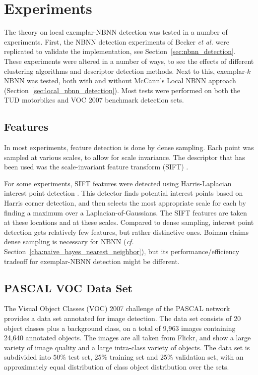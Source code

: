 \chapter{Experiments} %
\label{cha:experimental_setup}

The theory on local exemplar-NBNN detection was tested in a number of experiments. First, the NBNN detection experiments of Becker \emph{et al.} \cite{becker2012codebook} were replicated to validate the implementation, see Section~\ref{sec:nbnn_detection}. These experiments were altered in a number of ways, to see the effects of different clustering algorithms and descriptor detection methods. Next to this, exemplar-$k$NBNN was tested, both with and without McCann's Local NBNN approach (Section~\ref{sec:local_nbnn_detection}). Most tests were performed on both the TUD motorbikes and VOC 2007 benchmark detection sets.

\section{Features} %
\label{sec:features}

In most experiments, feature detection is done by dense sampling. Each point was sampled at various scales, to allow for scale invariance. The descriptor that has been used was the scale-invariant feature transform (SIFT) \cite{lowe2004distinctive}.

For some experiments, SIFT features were detected using Harris-Laplacian interest point detection \cite{mikolajczyk2005comparison, vandeSande2010colorSIFT}. This detector finds potential interest points based on Harris corner detection, and then selects the most appropriate scale for each by finding a maximum over a Laplacian-of-Gaussians. The SIFT features are taken at these locations and at these scales. Compared to dense sampling, interest point detection gets relatively few features, but rather distinctive ones. Boiman claims dense sampling is necessary for NBNN (\emph{cf.} Section~\ref{cha:naive_bayes_nearest_neighbor}), but its performance/efficiency tradeoff for exemplar-NBNN detection might be different.


\section{PASCAL VOC Data Set} %

\label{sec:voc_data_set}
The Visual Object Classes (VOC) 2007 challenge of the PASCAL network \cite{pascal-voc-2007} provides a data set annotated for image detection. The data set consists of 20 object classes plus a background class, on a total of 9,963 images containing 24,640 annotated objects. The images are all taken from Flickr, and show a large variety of image quality and a large intra-class variety of objects. The data set is subdivided into 50\% test set, 25\% training set and 25\% validation set, with an approximately equal distribution of class object distribution over the sets.

